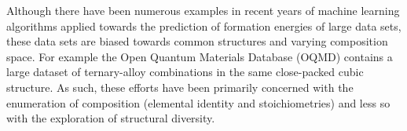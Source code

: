 %
%
Although there have been numerous examples in recent years of machine learning algorithms applied towards the prediction of formation energies of large  data sets,
these data sets are biased towards common structures and varying composition space.
%
For example the Open Quantum Materials Database (OQMD) contains a large dataset of ternary-alloy combinations in the same close-packed cubic structure.\cite{Kirklin2015}
%
As such, these efforts have been primarily concerned with the enumeration of composition (elemental identity and stoichiometries) and less so with the exploration of structural diversity.
%
%

